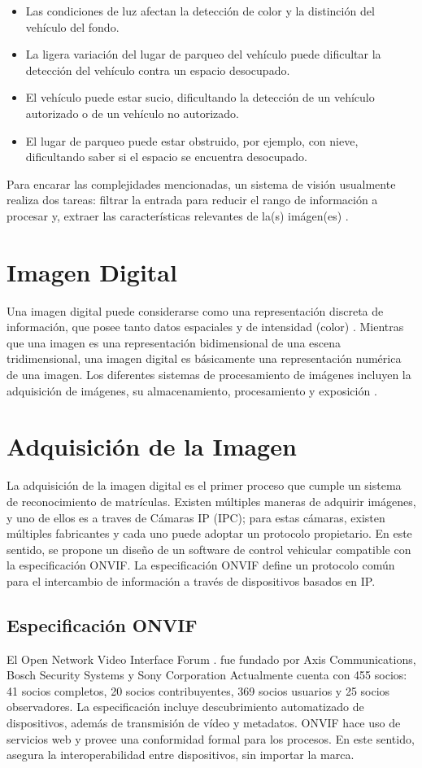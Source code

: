 \begin{itemize}
    \item Las condiciones de luz afectan la detección de color y la distinción del vehículo del fondo.
    \item La ligera variación del lugar de parqueo del vehículo puede dificultar la detección del vehículo contra un espacio desocupado. 
    \item El vehículo puede estar sucio, dificultando la detección de un vehículo autorizado o de un vehículo no autorizado. 
    \item El lugar de parqueo puede estar obstruido, por ejemplo, con nieve, dificultando saber si el espacio se encuentra desocupado.
\end{itemize}
Para encarar las complejidades mencionadas, un sistema de visión usualmente realiza dos tareas: filtrar la entrada para reducir el rango de información a procesar y, extraer las características relevantes de la(s) imágen(es) \cite{Demaagd2012-qb}.

\section{Imagen Digital}
Una imagen digital puede considerarse como una representación discreta de información, que posee tanto datos espaciales y de intensidad (color) \cite{Solomon2011-xz}.
Mientras que una imagen es una representación bidimensional de una escena tridimensional, una imagen digital es básicamente una representación numérica de una imagen. Los diferentes sistemas de procesamiento de imágenes incluyen la adquisición de imágenes, su almacenamiento, procesamiento y exposición \cite{Jayaraman2011-jb}.
\section{Adquisición de la Imagen}
La adquisición de la imagen digital es el primer proceso que cumple un sistema de reconocimiento de matrículas. Existen múltiples maneras de adquirir imágenes, y uno de ellos es a traves de Cámaras IP (IPC); para estas cámaras, existen múltiples fabricantes y cada uno puede adoptar un protocolo propietario. En este sentido, se propone un diseño de un software de control vehicular compatible con la especificación ONVIF. La especificación ONVIF define un protocolo común para el intercambio de información a través de dispositivos basados en IP. 

\subsection{Especificación ONVIF}
El Open Network Video Interface Forum \cite{Onvif2016-bt}. fue fundado por Axis Communications, Bosch Security Systems y Sony Corporation Actualmente cuenta con 455 socios: 41 socios completos, 20 socios contribuyentes, 369 socios usuarios y 25 socios observadores. La especificación incluye descubrimiento automatizado de  dispositivos,  además de  transmisión de vídeo y metadatos. ONVIF hace uso de servicios web y provee una conformidad formal para los procesos. En este sentido, asegura la interoperabilidad entre dispositivos, sin importar la marca. 


